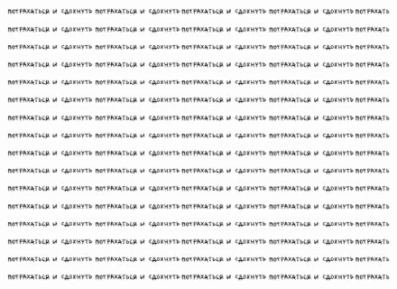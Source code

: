 \begin{figure}[H]
    \includegraphics[scale=0.228]{img/dfsdfa}
    \includegraphics[scale=0.228]{img/dfsdfa}
    \includegraphics[scale=0.228]{img/dfsdfa}
    \includegraphics[scale=0.228]{img/dfsdfa}
    \includegraphics[scale=0.228]{img/dfsdfa}
    \includegraphics[scale=0.228]{img/dfsdfa}
    \includegraphics[scale=0.228]{img/dfsdfa}
    \includegraphics[scale=0.228]{img/dfsdfa}
    \includegraphics[scale=0.228]{img/dfsdfa}
    \includegraphics[scale=0.228]{img/dfsdfa}
    \includegraphics[scale=0.228]{img/dfsdfa}
    \includegraphics[scale=0.228]{img/dfsdfa}
    \includegraphics[scale=0.228]{img/dfsdfa}
    \includegraphics[scale=0.228]{img/dfsdfa}
    \includegraphics[scale=0.228]{img/dfsdfa}
    \includegraphics[scale=0.228]{img/dfsdfa}
\end{figure}

